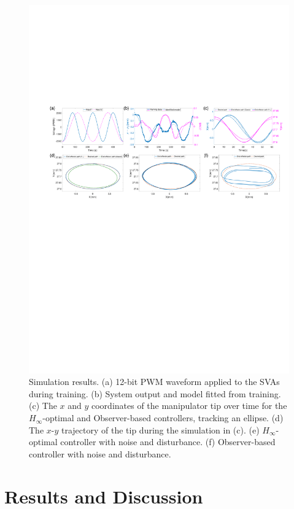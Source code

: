 \begin{figure}[t]
\centering
    \includegraphics[width=\textwidth]{Figure_Sim_6.pdf}
    \caption[Simulation results of the controller]{Simulation results. (a) 12-bit PWM waveform applied to the SVAs during training. (b) System output and model fitted from training. (c) The $x$ and $y$ coordinates of the manipulator tip over time for the $H_\infty$-optimal and Observer-based controllers, tracking an ellipse. (d) The $x$-$y$ trajectory of the tip during the simulation in (c).
    (e) $H_\infty$-optimal controller with noise and disturbance. (f) Observer-based controller with noise and disturbance.} \vspace{-0.5cm}
\label{fig:sim}
\end{figure}

\section{Results and Discussion}

